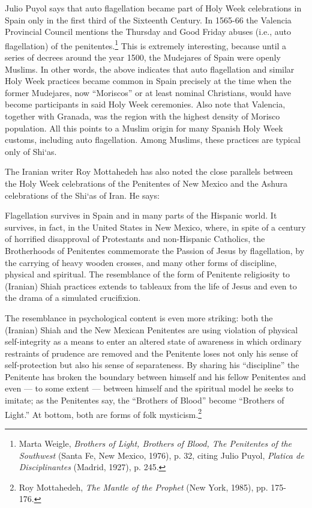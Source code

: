 Julio Puyol says that auto flagellation became part of Holy Week celebrations in Spain only in the first third of the Sixteenth Century. In 1565-66 the Valencia Provincial Council mentions the Thursday and Good Friday abuses (i.e., auto flagellation) of the penitentes.\footnote{Marta Weigle, \emph{Brothers of Light, Brothers of Blood, The Penitentes of the Southwest} (Santa Fe, New Mexico, 1976), p. 32, citing Julio Puyol, \emph{Platica de Disciplinantes} (Madrid, 1927), p. 245.} This is extremely interesting, because until a series of decrees around the year 1500, the Mudejares of Spain were openly Muslims. In other words, the above indicates that auto flagellation and similar Holy Week practices became common in Spain precisely at the time when the former Mudejares, now ``Moriscos'' or at least nominal Christians, would have become participants in said Holy Week ceremonies. Also note that Valencia, together with Granada, was the region with the highest density of Morisco population. All this points to a Muslim origin for many Spanish Holy Week customs, including auto flagellation. Among Muslims, these practices are typical only of Shi`as.

The Iranian writer Roy Mottahedeh has also noted the close parallels between the Holy Week celebrations of the Penitentes of New Mexico and the Ashura celebrations of the Shi`as of Iran. He says:

Flagellation survives in Spain and in many parts of the Hispanic world. It survives, in fact, in the United States in New Mexico, where, in spite of a century of horrified disapproval of Protestants and non-Hispanic Catholics, the Brotherhoods of Penitentes commemorate the Passion of Jesus by flagellation, by the carrying of heavy wooden crosses, and many other forms of discipline, physical and spiritual. The resemblance of the form of Penitente religiosity to (Iranian) Shiah practices extends to tableaux from the life of Jesus and even to the drama of a simulated crucifixion.

The resemblance in psychological content is even more striking: both the (Iranian) Shiah and the New Mexican Penitentes are using violation of physical self-integrity as a means to enter an altered state of awareness in which ordinary restraints of prudence are removed and the Penitente loses not only his sense of self-protection but also his sense of separateness. By sharing his ``discipline'' the Penitente has broken the boundary between himself and his fellow Penitentes and even --- to some extent --- between himself and the spiritual model he seeks to imitate; as the Penitentes say, the ``Brothers of Blood'' become ``Brothers of Light.'' At bottom, both are forms of folk mysticism.\footnote{Roy Mottahedeh, \emph{The Mantle of the Prophet} (New York, 1985), pp. 175-176.}

